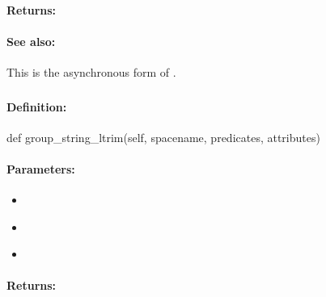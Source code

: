 \paragraph{Returns:}


\paragraph{See also:}  This is the asynchronous form of .

\pagebreak
\subsubsection{}
\label{api:python:group_string_ltrim}


\paragraph{Definition:}
\begin{pythoncode}
def group_string_ltrim(self, spacename, predicates, attributes)
\end{pythoncode}

\paragraph{Parameters:}
\begin{itemize}[noitemsep]
\item {}\\

\item {}\\

\item {}\\

\end{itemize}

\paragraph{Returns:}


\pagebreak
\subsubsection{}
\label{api:python:async_group_string_ltrim}


